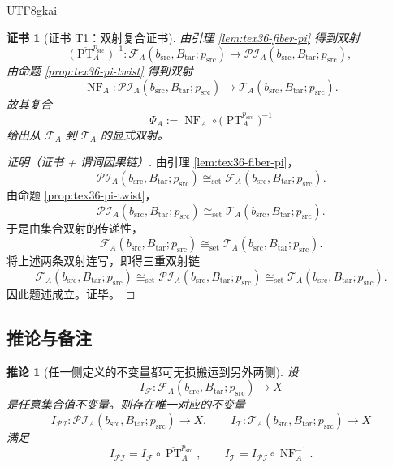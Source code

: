 \documentclass[12pt]{article}
\newtheorem{corollary}{推论}[section]
\newtheorem{Certificate}{证书}[section]
\newcommand{\PT}{\operatorname{PT}}
\newcommand{\NF}{\operatorname{NF}}
\begin{document}
\begin{CJK*}{UTF8}{gkai}
\begin{Certificate}[证书 T1：双射复合证书]
\label{cert:tex36-t1}
由引理 \ref{lem:tex36-fiber-pi} 得到双射
\[
  \bigl(\overline{\PT}_A^{p_{\mathrm{src}}}\bigr)^{-1}:
  \mathcal{F}_{A}(b_{\mathrm{src}},B_{\mathrm{tar}};p_{\mathrm{src}})
  \to
  \mathcal{PI}_{A}(b_{\mathrm{src}},B_{\mathrm{tar}};p_{\mathrm{src}}),
\]
由命题 \ref{prop:tex36-pi-twist} 得到双射
\[
  \NF_A:
  \mathcal{PI}_{A}(b_{\mathrm{src}},B_{\mathrm{tar}};p_{\mathrm{src}})
  \to
  \mathcal{T}_{A}(b_{\mathrm{src}},B_{\mathrm{tar}};p_{\mathrm{src}}).
\]
故其复合
\[
  \Psi_A
  :=
  \NF_A\circ
  \bigl(\overline{\PT}_A^{p_{\mathrm{src}}}\bigr)^{-1}
\]
给出从 $\mathcal{F}_A$ 到 $\mathcal{T}_A$ 的显式双射。
\end{Certificate}

\begin{proof}[证明（证书 + 谓词因果链）]
由引理 \ref{lem:tex36-fiber-pi}，
\[
  \mathcal{PI}_{A}(b_{\mathrm{src}},B_{\mathrm{tar}};p_{\mathrm{src}})
  \cong_{\mathrm{set}}
  \mathcal{F}_{A}(b_{\mathrm{src}},B_{\mathrm{tar}};p_{\mathrm{src}}).
\]
由命题 \ref{prop:tex36-pi-twist}，
\[
  \mathcal{PI}_{A}(b_{\mathrm{src}},B_{\mathrm{tar}};p_{\mathrm{src}})
  \cong_{\mathrm{set}}
  \mathcal{T}_{A}(b_{\mathrm{src}},B_{\mathrm{tar}};p_{\mathrm{src}}).
\]
于是由集合双射的传递性，
\[
  \mathcal{F}_{A}(b_{\mathrm{src}},B_{\mathrm{tar}};p_{\mathrm{src}})
  \cong_{\mathrm{set}}
  \mathcal{T}_{A}(b_{\mathrm{src}},B_{\mathrm{tar}};p_{\mathrm{src}}).
\]
将上述两条双射连写，即得三重双射链
\[
  \mathcal{F}_{A}(b_{\mathrm{src}},B_{\mathrm{tar}};p_{\mathrm{src}})
  \cong_{\mathrm{set}}
  \mathcal{PI}_{A}(b_{\mathrm{src}},B_{\mathrm{tar}};p_{\mathrm{src}})
  \cong_{\mathrm{set}}
  \mathcal{T}_{A}(b_{\mathrm{src}},B_{\mathrm{tar}};p_{\mathrm{src}}).
\]
因此题述成立。证毕。
\end{proof}

\subsection{推论与备注}
\label{subsec:tex36-corollary-remark}

\begin{corollary}[任一侧定义的不变量都可无损搬运到另外两侧]
\label{cor:tex36-transport}
设
\[
  I_{\mathcal{F}}:
  \mathcal{F}_{A}(b_{\mathrm{src}},B_{\mathrm{tar}};p_{\mathrm{src}})
  \to X
\]
是任意集合值不变量。则存在唯一对应的不变量
\[
  I_{\mathcal{PI}}:
  \mathcal{PI}_{A}(b_{\mathrm{src}},B_{\mathrm{tar}};p_{\mathrm{src}})
  \to X,
  \qquad
  I_{\mathcal{T}}:
  \mathcal{T}_{A}(b_{\mathrm{src}},B_{\mathrm{tar}};p_{\mathrm{src}})
  \to X
\]
满足
\[
  I_{\mathcal{PI}}
  =
  I_{\mathcal{F}}\circ \overline{\PT}_A^{p_{\mathrm{src}}},
  \qquad
  I_{\mathcal{T}}
  =
  I_{\mathcal{PI}}\circ \NF_A^{-1}.
\]
\end{corollary}


\end{CJK*}
\end{document}
